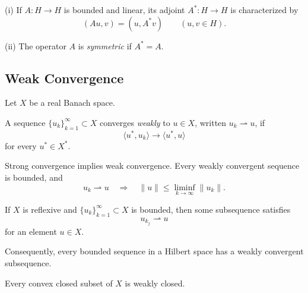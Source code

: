 \begin{definition}
\label{def:adjoint-symmetric-operator}
(i) If $A:H\to H$ is bounded and linear, its adjoint $A^*:H\to H$ is characterized by
\[
(Au,v)=(u,A^*v)
\qquad(u,v\in H).
\]

(ii) The operator $A$ is \textit{symmetric} if $A^*=A$.
\end{definition}

\subsection{Weak Convergence}
\label{sec:weak-convergence-appendix-d}

Let $X$ be a real Banach space.

\begin{definition}
\label{def:weak-convergence}
A sequence $\{u_k\}_{k=1}^\infty\subset X$ converges \textit{weakly} to $u\in X$, written $u_k\rightharpoonup u$, if
\[
\langle u^*,u_k\rangle\to\langle u^*,u\rangle
\]
for every $u^*\in X^*$.
\end{definition}

\begin{remark}
\label{rem:weak-convergence-basic-properties}
Strong convergence implies weak convergence. Every weakly convergent sequence is bounded, and
\[
u_k\rightharpoonup u
\quad\Longrightarrow\quad
\|u\|\leq\liminf_{k\to\infty}\|u_k\|.
\]
\end{remark}

\begin{theorem}
\label{thm:weak-compactness-reflexive-banach}
If $X$ is reflexive and $\{u_k\}_{k=1}^\infty\subset X$ is bounded, then some subsequence satisfies
\[
u_{k_j}\rightharpoonup u
\]
for an element $u\in X$.
\end{theorem}

Consequently, every bounded sequence in a Hilbert space has a weakly convergent subsequence.

\begin{theorem}
\label{thm:mazurs-theorem}
Every convex closed subset of $X$ is weakly closed.
\end{theorem}

